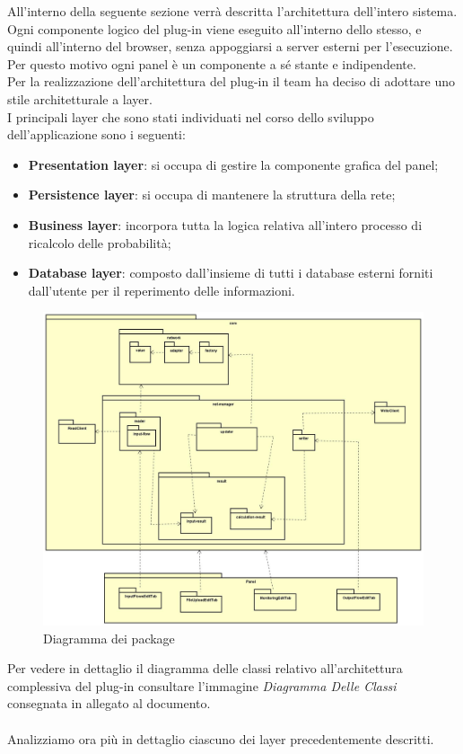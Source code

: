 \pagebreak
{}
All'interno della seguente sezione verrà descritta l'architettura dell'intero sistema.\\
Ogni componente logico del plug-in viene eseguito all'interno dello stesso, e quindi all'interno del browser, senza appoggiarsi a server esterni per l'esecuzione. Per questo motivo ogni panel è un componente a sé stante e indipendente. \\
Per la realizzazione dell'architettura del plug-in il team ha deciso di adottare uno stile architetturale a layer.\\
I principali layer che sono stati individuati nel corso dello sviluppo dell'applicazione sono i seguenti:
\begin{itemize}
	\item{\textbf{Presentation layer}: si occupa di gestire la componente grafica del panel;}
	\item{\textbf{Persistence layer}: si occupa di mantenere la struttura della rete;}
	\item{\textbf{Business layer}: incorpora tutta la logica relativa all’intero processo di ricalcolo delle probabilità;}
	\item{\textbf{Database layer}: composto dall’insieme di tutti i database esterni forniti dall’utente per il reperimento delle informazioni.}
\end{itemize}
\begin{figure} [H]
	\centerline{
	\includegraphics[scale=0.3]{Img/Diagramma_Package}}
	\caption{Diagramma dei package}\label{}
\end{figure}
Per vedere in dettaglio il diagramma delle classi relativo all'architettura complessiva del plug-in consultare l'immagine \emph{Diagramma Delle Classi} consegnata in allegato al documento. \\ \\
Analizziamo ora più in dettaglio ciascuno dei layer precedentemente descritti.
